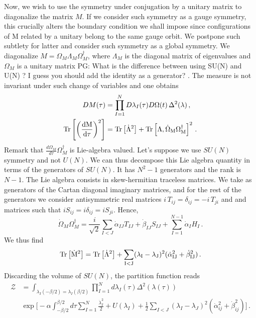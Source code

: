 \documentclass[a4paper]{article}
\newcommand{\purple}[1]{{\color{purple} #1 \color{black}}}
\newcommand{\PG}[1]{{\purple{PG: #1}}} %
\begin{document}
Now, we wish to use the symmetry under conjugation by a unitary matrix to diagonalize the matrix $M$. If we consider such symmetry as a gauge symmetry, this crucially alters the boundary condition we shall impose since configurations of M related by a unitary belong to the same gauge orbit. We postpone such subtlety for latter and consider such symmetry as a global symmetry. We diagonalize $M = \Omega_M \Lambda_M \Omega_M^\dagger$, where $\Lambda_M$ is the diagonal matrix of eigenvalues and $\Omega_M$ is a unitary matrix\PG{What is the difference between using SU(N) and U(N) ? I guess you should add the identity as a generator?}. The measure is not invariant under such change of variables and one obtains
\begin{equation}
  \begin{aligned}
    DM(\tau) &= \prod_{I=1}^N D\lambda_I(\tau)D\Omega(t) \, \Delta^2(\lambda)\,,\\
    \rm{Tr}\left[\left(\frac{dM}{d\tau}\right)^2\right] &= \rm{Tr}\left[\dot{\Lambda}^2\right] + \rm{Tr}\left[\Lambda,\dot{\Omega}_M \Omega_M^{\dagger}\right]^2 \,.
  \end{aligned}
\end{equation}
Remark that $\frac{d\Omega_M}{d\tau} \Omega_M^{\dagger}$ is Lie-algebra valued. Let's suppose we use $SU(N)$ symmetry and not $U(N)$. We can thus decompose this Lie algebra quantity in terms of the generators of $SU(N)$. It has $N^2-1$ generators and the rank is $N-1$. The Lie algebra consists in skew-hermitian traceless matrices. We take as generators of the Cartan diagonal imaginary matrices, and for the rest of the generators we consider antisymmetric real matrices $i\,T_{ij}=\delta_{ij}=-i\,T_{ji}$ and and matrices such that $iS_{ij}=i\delta_{ij}=iS_{ji}$. Hence,
\begin{equation}
  \dot{\Omega}_M \Omega_M^{\dagger} = \frac{i}{\sqrt{2}}\sum_{I<J} \dot{\alpha}_{IJ} T_{IJ} + \dot{\beta}_{IJ} S_{IJ} + \sum_{I=1}^{N-1} \dot{\alpha}_I H_I\,.
\end{equation}
We thus find
\begin{equation}
  \rm{Tr}\left[\dot{M}^2\right] = \rm{Tr}\left[\dot{\Lambda}^2\right] + \sum_{I<J} (\lambda_I-\lambda_J)^2 (\dot{\alpha}_{IJ}^2 + \dot{\beta}_{IJ}^2)\,.
\end{equation}
Discarding the volume of $SU(N)$, the partition function reads
\begin{equation}
\begin{aligned}
  \mathcal{Z}&=\int_{\lambda_{I}(-\beta/2)=\lambda_{I}(\beta/2)} \prod_{I=1}^{N}d\lambda_{I}(\tau) \Delta^2(\lambda(\tau)) \\
  &\exp\Bigg[-\alpha\int_{-\beta/2}^{\beta/2} d\tau \sum_{I=1}^N \frac{\dot{\lambda}^2_I}{2}+U(\lambda_I)+\frac{1}{2}\sum_{I<J}(\lambda_I-\lambda_J)^2(\dot{\alpha}_{ij}^2 + \dot{\beta}_{ij}^2)\Bigg]\,.
\end{aligned}
\end{equation}
\end{document}
